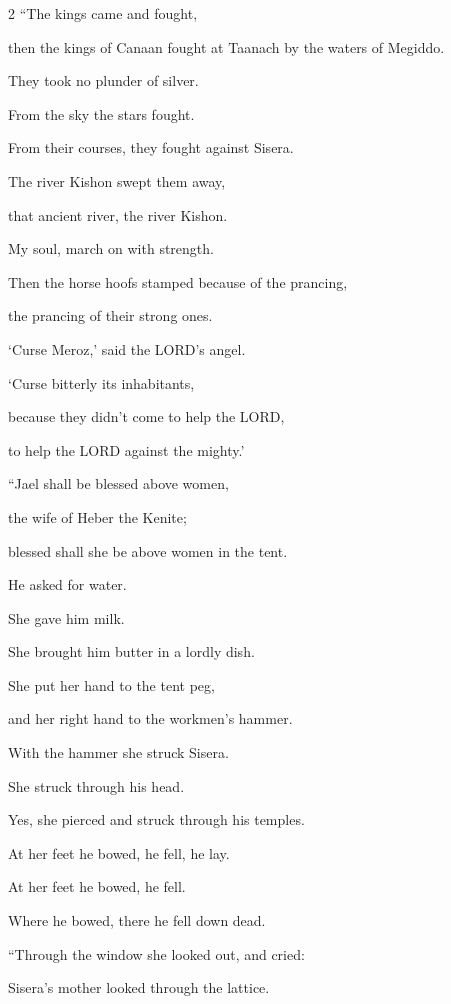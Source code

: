 \begin{multicols}{2}
\vspace{\baselineskip} \myverse{}“The kings came and fought,

then the kings of Canaan fought at Taanach by the waters of Megiddo.

They took no plunder of silver.

\myverse{}From the sky the stars fought.

From their courses, they fought against Sisera.

\myverse{}The river Kishon swept them away,

that ancient river, the river Kishon.

My soul, march on with strength.

\myverse{}Then the horse hoofs stamped because of the prancing,

the prancing of their strong ones.

\myverse{}‘Curse Meroz,’ said the LORD’s angel.

‘Curse bitterly its inhabitants,

because they didn’t come to help the LORD,

to help the LORD against the mighty.’


\vspace{\baselineskip} \myverse{}“Jael shall be blessed above women,

the wife of Heber the Kenite;

blessed shall she be above women in the tent.

\myverse{}He asked for water.

She gave him milk.

She brought him butter in a lordly dish.

\myverse{}She put her hand to the tent peg,

and her right hand to the workmen’s hammer.

With the hammer she struck Sisera.

She struck through his head.

Yes, she pierced and struck through his temples.

\myverse{}At her feet he bowed, he fell, he lay.

At her feet he bowed, he fell.

Where he bowed, there he fell down dead.


\vspace{\baselineskip} \myverse{}“Through the window she looked out, and cried:

Sisera’s mother looked through the lattice.


\end{multicols}
